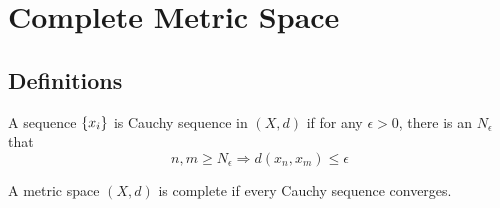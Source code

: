 \chapter{Complete Metric Space}


\section{Definitions}

\begin{definition}
    A sequence $\set{x_i}$ is Cauchy sequence in $(X, d)$ if for any $\epsilon > 0$, there is an $N_\epsilon$ that 
    \begin{equation}
        n, m \geq N_\epsilon \Rightarrow d(x_n, x_m) \leq \epsilon
    \end{equation}
\end{definition}

\begin{definition}
    A metric space $(X,d)$ is complete if every Cauchy sequence converges.
\end{definition}


